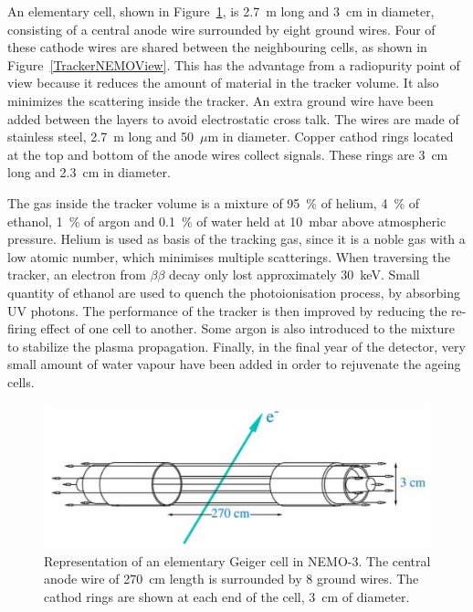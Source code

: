 \documentclass[main.tex]{subfiles}
\begin{document}
\NI An elementary cell, shown in Figure~\ref{GeigerCellNEMO3}, is 2.7~m long and 3~cm in diameter, consisting of a central anode wire surrounded by eight ground wires. Four of these cathode wires are shared between the neighbouring cells, as shown in Figure~\ref{TrackerNEMOView}. This has the advantage from a radiopurity point of view because it reduces the amount of material in the tracker volume. It also minimizes the scattering inside the tracker. An extra ground wire have been added between the layers to avoid electrostatic cross talk. The wires are made of stainless steel, 2.7~m long and 50~$\mu$m in diameter. Copper cathod rings located at the top and bottom of the anode wires collect signals. These rings are 3~cm long and 2.3~cm in diameter.


\bigskip


\NI The gas inside the tracker volume is a mixture of 95~\% of helium, 4~\% of ethanol, 1~\% of argon and 0.1~\% of water held at 10~mbar above atmospheric pressure. Helium is used as basis of the tracking gas, since it is a noble gas with a low atomic number, which minimises multiple scatterings. When traversing the tracker, an electron from $\beta\beta$ decay only lost approximately 30~keV. Small quantity of ethanol are used to quench the photoionisation process, by absorbing UV photons. The performance of the tracker is then improved by reducing the re-firing effect of one cell to another. Some argon is also introduced to the mixture to stabilize the plasma propagation. Finally, in the final year of the detector, very small amount of water vapour have been added in order to rejuvenate the ageing cells.



\begin{figure}[h!]
\begin{center}
\includegraphics[scale=0.3]{pictures/Chap3/GeigerCellNEMO3.png}
\caption{Representation of an elementary Geiger cell in NEMO-3. The central anode wire of 270~cm length is surrounded by 8 ground wires. The cathod rings are shown at each end of the cell, 3~cm of diameter.}
\label{GeigerCellNEMO3}
\end{center}
\end{figure}
\end{document}
